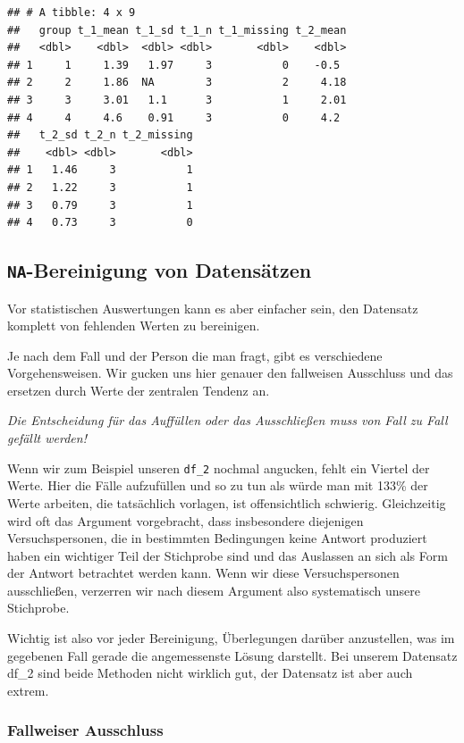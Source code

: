 \documentclass[
]{book}
\begin{document}
\begin{verbatim}
## # A tibble: 4 x 9
##   group t_1_mean t_1_sd t_1_n t_1_missing t_2_mean
##   <dbl>    <dbl>  <dbl> <dbl>       <dbl>    <dbl>
## 1     1     1.39   1.97     3           0    -0.5 
## 2     2     1.86  NA        3           2     4.18
## 3     3     3.01   1.1      3           1     2.01
## 4     4     4.6    0.91     3           0     4.2 
##   t_2_sd t_2_n t_2_missing
##    <dbl> <dbl>       <dbl>
## 1   1.46     3           1
## 2   1.22     3           1
## 3   0.79     3           1
## 4   0.73     3           0
\end{verbatim}

\hypertarget{na-bereinigung-von-datensuxe4tzen}{%
\subsection{\texorpdfstring{\texttt{NA}-Bereinigung von Datensätzen}{NA-Bereinigung von Datensätzen}}\label{na-bereinigung-von-datensuxe4tzen}}

Vor statistischen Auswertungen kann es aber einfacher sein, den Datensatz komplett von fehlenden Werten zu bereinigen.

Je nach dem Fall und der Person die man fragt, gibt es verschiedene Vorgehensweisen. Wir gucken uns hier genauer den fallweisen Ausschluss und das ersetzen durch Werte der zentralen Tendenz an.

\emph{Die Entscheidung für das Auffüllen oder das Ausschließen muss von Fall zu Fall gefällt werden!}

Wenn wir zum Beispiel unseren \texttt{df\_2} nochmal angucken, fehlt ein Viertel der Werte.
Hier die Fälle aufzufüllen und so zu tun als würde man mit 133\% der Werte arbeiten, die tatsächlich vorlagen, ist offensichtlich schwierig.
Gleichzeitig wird oft das Argument vorgebracht, dass insbesondere diejenigen Versuchspersonen, die in bestimmten Bedingungen keine Antwort produziert haben ein wichtiger Teil der Stichprobe sind und das Auslassen an sich als Form der Antwort betrachtet werden kann.
Wenn wir diese Versuchspersonen ausschließen, verzerren wir nach diesem Argument also systematisch unsere Stichprobe.

Wichtig ist also vor jeder Bereinigung, Überlegungen darüber anzustellen, was im gegebenen Fall gerade die angemessenste Lösung darstellt.
Bei unserem Datensatz df\_2 sind beide Methoden nicht wirklich gut, der Datensatz ist aber auch extrem.

\hypertarget{fallweiser-ausschluss}{%
\subsubsection{Fallweiser Ausschluss}\label{fallweiser-ausschluss}}
\end{document}
